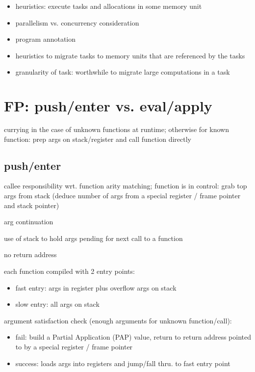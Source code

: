 \documentclass[8pt]{extarticle}
\begin{document}
\begin{multicols*}{2}
\begin{itemize}
\item heuristics: execute tasks and allocations in some memory unit
\item parallelism vs. concurrency consideration
\item program annotation
\item heuristics to migrate tasks to memory units that are referenced  by the tasks
\item granularity of task: worthwhile to migrate large computations in a task
\end{itemize}

\vfill\null
\columnbreak

\section{FP: push/enter vs. eval/apply \cite{marlow2004}}

currying in the case of unknown functions at runtime; otherwise for known function: prep args on stack/register and call function directly

\subsection{push/enter}

callee responsibility wrt. function arity matching; function is in control: grab top args from stack (deduce number of args from a special register / frame pointer and stack pointer)

arg continuation

use of stack to hold args pending for next call to a function

no return address

each function compiled with 2 entry points:
\begin{itemize}
\item fast entry: args in register plus overflow args on stack
\item slow entry: all args on stack
\end{itemize}

argument satisfaction check (enough arguments for unknown function/call):
\begin{itemize}
\item fail: build a Partial Application (PAP) value, return to return address pointed to by a special register / frame pointer
\item success: loads args into registers and jump/fall thru. to fast entry point
\end{itemize}


\end{multicols*}
\end{document}
